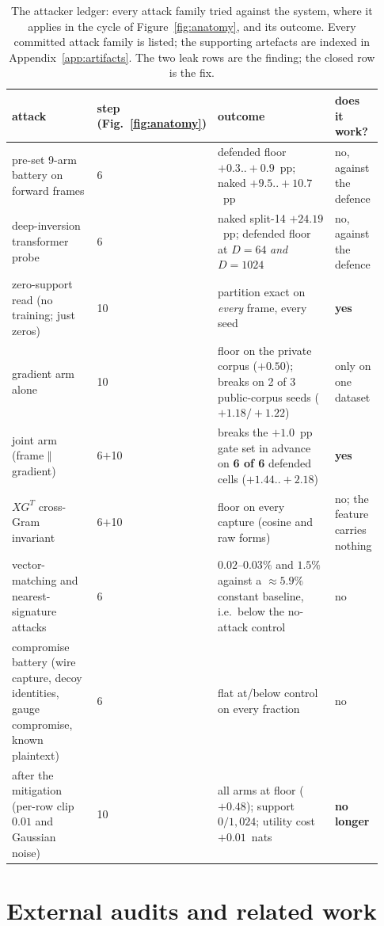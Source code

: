 \documentclass[11pt]{article}
\newcommand{\pp}{pp}
\begin{document}
\begin{table}[H]
\centering\scriptsize
\setlength{\tabcolsep}{3pt}
\begin{tabular}{@{}p{0.28\linewidth}p{0.08\linewidth}p{0.44\linewidth}p{0.13\linewidth}@{}}
\toprule
attack & step (Fig.~\ref{fig:anatomy}) & outcome & does it work? \\
\midrule
pre-set 9-arm battery on forward frames & 6 & defended floor $+0.3..+0.9$~\pp{}; naked $+9.5..+10.7$~\pp{} & no, against the defence \\
deep-inversion transformer probe & 6 & naked split-14 $+24.19$~\pp{}; defended floor at $D{=}64$ \emph{and} $D{=}1024$ & no, against the defence \\
zero-support read (no training; just zeros) & 10 & partition exact on \emph{every} frame, every seed & \textbf{yes} \\
gradient arm alone & 10 & floor on the private corpus ($+0.50$); breaks on 2 of 3 public-corpus seeds ($+1.18/+1.22$) & only on one dataset \\
joint arm (frame $\Vert$ gradient) & 6$+$10 & breaks the $+1.0$~\pp{} gate set in advance on \textbf{6 of 6} defended cells ($+1.44..+2.18$) & \textbf{yes} \\
$XG^{T}$ cross-Gram invariant & 6$+$10 & floor on every capture (cosine and raw forms) & no; the feature carries nothing \\
vector-matching and nearest-signature attacks & 6 & $0.02$--$0.03\%$ and $1.5\%$ against a $\approx 5.9\%$ constant baseline, i.e.\ below the no-attack control & no \\
compromise battery (wire capture, decoy identities, gauge compromise, known plaintext) & 6 & flat at/below control on every fraction & no \\
\midrule
after the mitigation (per-row clip $0.01$ and Gaussian noise) & 10 & all arms at floor ($+0.48$); support $0/1{,}024$; utility cost $+0.01$~nats & \textbf{no longer} \\
\bottomrule
\end{tabular}


\caption{The attacker ledger: every attack family tried against the system,
where it applies in the cycle of Figure~\ref{fig:anatomy}, and its outcome.
Every committed attack family is listed; the supporting artefacts are indexed
in Appendix~\ref{app:artifacts}. The two leak rows are the finding; the closed
row is the fix.}
\label{tab:attacker_ledger}
\end{table}

\section{External audits and related work}
\label{sec:related}
\end{document}

